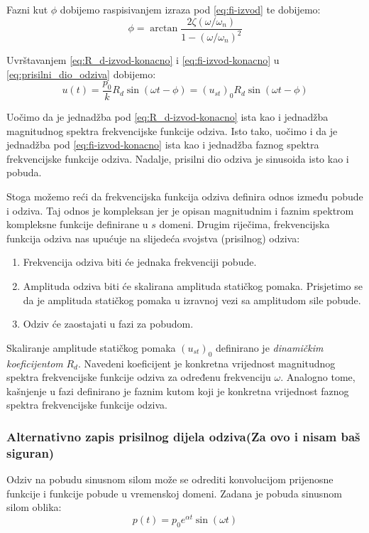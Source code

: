 Fazni kut $\phi$ dobijemo raspisivanjem izraza pod \eqref{eq:fi-izvod} te dobijemo:
\begin{equation}\label{eq:fi-izvod-konacno}
    \phi = \arctan{\frac{2\zeta(\omega/\omega_n)}{1-(\omega/\omega_n)^2}}
\end{equation}

Uvrštavanjem \eqref{eq:R_d-izvod-konacno} i \eqref{eq:fi-izvod-konacno} u
\eqref{eq:prisilni_dio_odziva} dobijemo:
\begin{equation}
    u(t) = \frac{p_0}{k}R_d\sin(\omega t - \phi) = (u_{st})_0R_d\sin(\omega t - \phi)
\end{equation}

Uočimo da je jednadžba pod \eqref{eq:R_d-izvod-konacno} ista kao i jednadžba
magnitudnog spektra frekvencijske funkcije odziva. Isto tako, uočimo i da je jednadžba
pod \eqref{eq:fi-izvod-konacno} ista kao i jednadžba faznog spektra frekvencijske
funkcije odziva. Nadalje, prisilni dio odziva je sinusoida isto kao i pobuda.
\par
 
Stoga možemo reći da frekvencijska funkcija odziva definira odnos između pobude i
odziva. Taj odnos je kompleksan jer je opisan magnitudnim i faznim spektrom
kompleksne funkcije definirane u $s$ domeni. Drugim riječima, frekvencijska funkcija
odziva nas upućuje na slijedeća svojstva (prisilnog) odziva:
\begin{enumerate}
    \item Frekvencija odziva biti će jednaka frekvenciji pobude.
    \item Amplituda odziva biti će skalirana amplituda statičkog pomaka. Prisjetimo
        se da je amplituda statičkog pomaka u izravnoj vezi sa amplitudom sile pobude.
    \item Odziv će zaostajati u fazi za pobudom. 
\end{enumerate}

Skaliranje amplitude statičkog pomaka $(u_{st})_0$ definirano je \textit{dinamičkim
koeficijentom} $R_d$. Navedeni koeficijent je konkretna vrijednost magnitudnog
spektra frekvencijske funkcije odziva za određenu frekvenciju $\omega$. Analogno
tome, kašnjenje u fazi definirano je faznim kutom koji je konkretna vrijednost
faznog spektra frekvencijske funkcije odziva.

\subsubsection{Alternativno zapis prisilnog dijela odziva(Za ovo i nisam baš
siguran)}
Odziv na pobudu sinusnom silom može se odrediti konvolucijom prijenosne funkcije i
funkcije pobude u vremenskoj domeni. Zadana je pobuda sinusnom silom oblika:
\begin{equation}\label{eq:pobuda_sinusnom_silom}
    p(t)=p_0e^{\alpha t} \sin(\omega t)
\end{equation}

